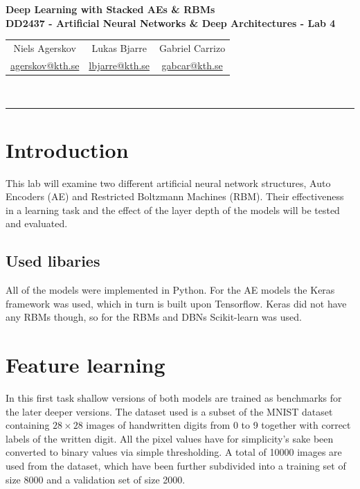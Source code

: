 \documentclass{article}
\newcommand{\mail}[1]{
  \href{mailto:#1}{#1}
}
\begin{document}
\begin{center}
  \textbf{
    \LARGE Deep Learning with Stacked AEs \& RBMs \\
    \vspace{.5ex}
    \large DD2437 - Artificial Neural Networks \& Deep Architectures - Lab 4\\
    \vspace{1ex}
  }
  \large
  \begin{tabular}{ccc}
    Niels Agerskov & Lukas Bjarre & Gabriel Carrizo \\
    \mail{agerskov@kth.se} & \mail{lbjarre@kth.se} & \mail{gabcar@kth.se}
  \end{tabular}
  \\
  \vspace{.5ex}
  \rule{\textwidth}{0.4pt}
\end{center}

\section{Introduction}
This lab will examine two different artificial neural network structures,
Auto Encoders (AE) and Restricted Boltzmann Machines (RBM).
Their effectiveness in a learning task 
and the effect of the layer depth of the models
will be tested and evaluated.

\subsection{Used libaries}
All of the models were implemented in Python.
For the AE models the Keras framework \cite{keras} was used,
which in turn is built upon Tensorflow.
Keras did not have any RBMs though,
so for the RBMs and DBNs Scikit-learn \cite{sklearn} was used.

\section{Feature learning}
In this first task shallow versions of both models are trained
as benchmarks for the later deeper versions.
The dataset used is a subset of the MNIST dataset
containing $28 \times 28$ images of handwritten digits from 0 to 9
together with correct labels of the written digit.
All the pixel values have for simplicity's sake been converted to binary values
via simple thresholding.
A total of 10000 images are used from the dataset,
which have been further subdivided into a training set of size 8000 and a validation set of size 2000.
\end{document}
